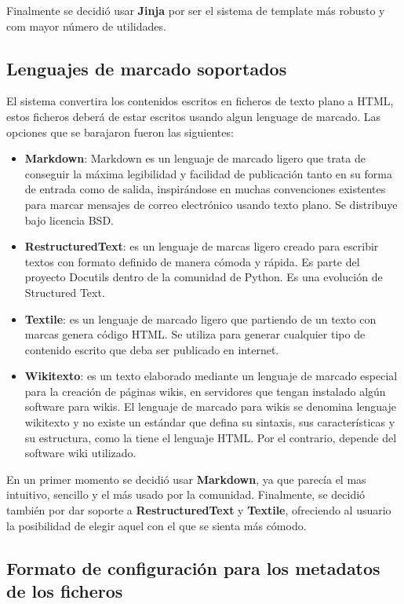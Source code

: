 Finalmente se decidió usar \textbf{Jinja} por ser el sistema de template más robusto y com mayor número de utilidades.

\subsection{Lenguajes de marcado soportados}

El sistema convertira los contenidos escritos en ficheros de texto plano a HTML, estos ficheros deberá de estar escritos
usando algun lenguage de marcado. Las opciones que se barajaron fueron las siguientes:

\begin{itemize}
\item \textbf{Markdown}: Markdown es un lenguaje de marcado ligero que trata de conseguir la máxima legibilidad y facilidad 
de publicación tanto en su forma de entrada como de salida, inspirándose en muchas convenciones existentes para marcar mensajes 
de correo electrónico usando texto plano. Se distribuye bajo licencia BSD.
\item \textbf{RestructuredText}: es un lenguaje de marcas ligero creado para escribir textos con formato definido de manera cómoda 
y rápida. Es parte del proyecto Docutils dentro de la comunidad de Python. Es una evolución de Structured Text.
\item \textbf{Textile}: es un lenguaje de marcado ligero que partiendo de un texto con marcas genera código HTML.
Se utiliza para generar cualquier tipo de contenido escrito que deba ser publicado en internet.
\item \textbf{Wikitexto}: es un texto elaborado mediante un lenguaje de marcado especial para la creación de páginas wikis,
en servidores que tengan instalado algún software para wikis. El lenguaje de marcado para wikis se denomina lenguaje wikitexto
y no existe un estándar que defina su sintaxis, sus características y su estructura, como la tiene el lenguaje HTML. Por el 
contrario, depende del software wiki utilizado.
\end{itemize}

En un primer momento se decidió usar \textbf{Markdown}, ya que parecía el mas intuitivo, sencillo y el más usado por la comunidad. Finalmente,
se decidió también por dar soporte a \textbf{RestructuredText} y \textbf{Textile}, ofreciendo al usuario la posibilidad de elegir aquel
con el que se sienta más cómodo.

\subsection{Formato de configuración para los metadatos de los ficheros}

